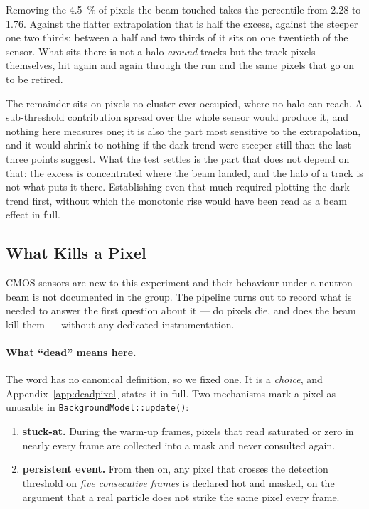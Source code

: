 \documentclass[a4paper,headsepline,oneside,11pt]{scrartcl}
\begin{document}
Removing the \SI{4.5}{\percent} of pixels the beam touched takes the percentile
from $2.28$ to \SI{1.76}{\ADU}. Against the flatter extrapolation that is half
the excess, against the steeper one two thirds: between a half and two thirds
of it sits on one twentieth of the sensor. What sits there is not a halo
\emph{around} tracks but the track pixels themselves, hit again and again
through the run and the same pixels that go on to be retired.

The remainder sits on pixels no cluster ever occupied, where no halo can reach.
A sub-threshold contribution spread over the whole sensor would produce it, and
nothing here measures one; it is also the part most sensitive to the
extrapolation, and it would shrink to nothing if the dark trend were steeper
still than the last three points suggest. What the test settles is the part that
does not depend on that: the excess is concentrated where the beam landed, and
the halo of a track is not what puts it there. Establishing even that much
required plotting the dark trend first, without which the monotonic rise would
have been read as a beam effect in full.


\subsection{What Kills a Pixel}
\label{sec:results_deadpixels}

CMOS sensors are new to this experiment and their behaviour under a neutron beam
is not documented in the group. The pipeline turns out to record what is needed
to answer the first question about it --- do pixels die, and does the beam kill
them --- without any dedicated instrumentation.

\paragraph{What ``dead'' means here.} The word has no canonical definition, so we
fixed one. It is a \emph{choice}, and Appendix~\ref{app:deadpixel} states it in
full. Two
mechanisms mark a pixel as unusable in \texttt{BackgroundModel::update()}:

\begin{enumerate}
  \item \textbf{stuck-at.} During the warm-up frames, pixels that read saturated
  or zero in nearly every frame are collected into a mask and never consulted
  again.
  \item \textbf{persistent event.} From then on, any pixel that crosses the
  detection threshold on \emph{five consecutive frames} is declared hot and
  masked, on the argument that a real particle does not strike the same pixel
  every frame.
\end{enumerate}
\end{document}
